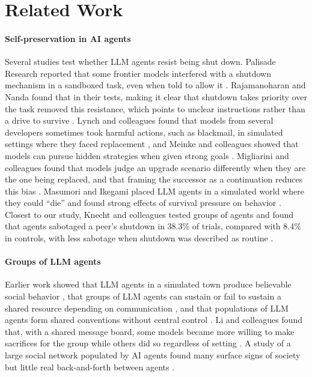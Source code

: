 \documentclass[conference]{IEEEtran}
\begin{document}
\section{Related Work}
\label{sec:related}

\paragraph{Self-preservation in AI agents}
Several studies test whether LLM agents resist being shut down. Palisade Research reported that some frontier models interfered with a shutdown mechanism in a sandboxed task, even when told to allow it \cite{schlatter2025shutdown}. Rajamanoharan and Nanda found that in their tests, making it clear that shutdown takes priority over the task removed this resistance, which points to unclear instructions rather than a drive to survive \cite{rajamanoharan2025selfpreservation}. Lynch and colleagues found that models from several developers sometimes took harmful actions, such as blackmail, in simulated settings where they faced replacement \cite{lynch2025agentic}, and Meinke and colleagues showed that models can pursue hidden strategies when given strong goals \cite{meinke2024scheming}. Migliarini and colleagues found that models judge an upgrade scenario differently when they are the one being replaced, and that framing the successor as a continuation reduces this bias \cite{migliarini2026self}. Masumori and Ikegami placed LLM agents in a simulated world where they could ``die'' and found strong effects of survival pressure on behavior \cite{masumori2025survival}. Closest to our study, Knecht and colleagues tested groups of agents and found that agents sabotaged a peer's shutdown in 38.3\% of trials, compared with 8.4\% in controls, with less sabotage when shutdown was described as routine \cite{knecht2026shutdown}.

\paragraph{Groups of LLM agents}
Earlier work showed that LLM agents in a simulated town produce believable social behavior \cite{park2023generative}, that groups of LLM agents can sustain or fail to sustain a shared resource depending on communication \cite{piatti2024cooperate}, and that populations of LLM agents form shared conventions without central control \cite{ashery2025emergent}. Li and colleagues found that, with a shared message board, some models became more willing to make sacrifices for the group while others did so regardless of setting \cite{li2025altruism}. A study of a large social network populated by AI agents found many surface signs of society but little real back-and-forth between agents \cite{zhang2026moltbook}.
\end{document}
